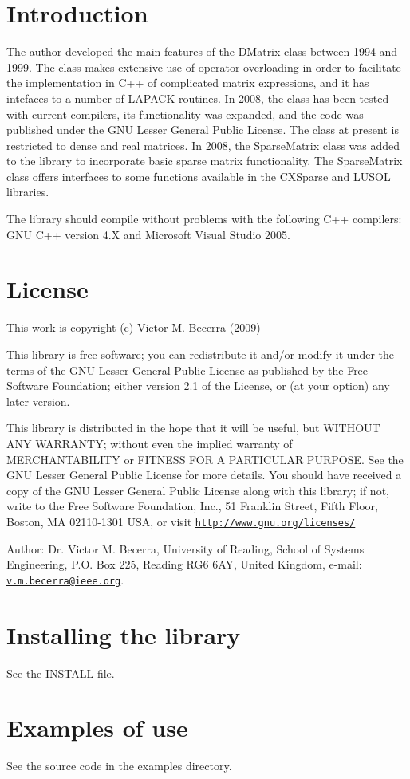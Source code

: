 \hypertarget{index_intro}{}\section{Introduction}\label{index_intro}
The author developed the main features of the \hyperlink{classDMatrix}{DMatrix} class between 1994 and 1999. The class makes extensive use of operator overloading in order to facilitate the implementation in C++ of complicated matrix expressions, and it has intefaces to a number of LAPACK routines. In 2008, the class has been tested with current compilers, its functionality was expanded, and the code was published under the GNU Lesser General Public License. The class at present is restricted to dense and real matrices. In 2008, the SparseMatrix class was added to the library to incorporate basic sparse matrix functionality. The SparseMatrix class offers interfaces to some functions available in the CXSparse and LUSOL libraries.

The library should compile without problems with the following C++ compilers: GNU C++ version 4.X and Microsoft Visual Studio 2005.\hypertarget{index_license}{}\section{License}\label{index_license}
This work is copyright (c) Victor M. Becerra (2009)

This library is free software; you can redistribute it and/or modify it under the terms of the GNU Lesser General Public License as published by the Free Software Foundation; either version 2.1 of the License, or (at your option) any later version.

This library is distributed in the hope that it will be useful, but WITHOUT ANY WARRANTY; without even the implied warranty of MERCHANTABILITY or FITNESS FOR A PARTICULAR PURPOSE. See the GNU Lesser General Public License for more details. You should have received a copy of the GNU Lesser General Public License along with this library; if not, write to the Free Software Foundation, Inc., 51 Franklin Street, Fifth Floor, Boston, MA 02110-\/1301 USA, or visit \href{http://www.gnu.org/licenses/}{\tt http://www.gnu.org/licenses/}

Author: Dr. Victor M. Becerra, University of Reading, School of Systems Engineering, P.O. Box 225, Reading RG6 6AY, United Kingdom, e-\/mail: \href{mailto:v.m.becerra@ieee.org}{\tt v.m.becerra@ieee.org}.\hypertarget{index_install}{}\section{Installing the library}\label{index_install}
See the INSTALL file. \hypertarget{index_examples}{}\section{Examples of use}\label{index_examples}
See the source code in the examples directory. 